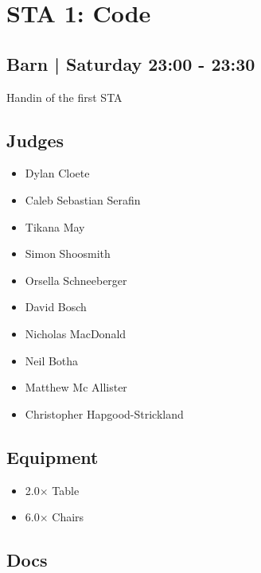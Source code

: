 \documentclass[10pt]{article}
\begin{document}
		\begin{minipage}{\linewidth}
		\setcounter{section}{25}
	\section{STA 1: Code }
	\subsection*{Barn | Saturday 23:00 - 23:30}

	Handin of the first STA

	\begin{multicols}{2}
	\subsection*{\faUsers \: Judges}
	\begin{itemize}
			\item Dylan Cloete
			\item Caleb Sebastian Serafin
			\item Tikana May
			\item Simon Shoosmith
			\item Orsella Schneeberger
			\item David Bosch
			\item Nicholas MacDonald
			\item Neil Botha
			\item Matthew Mc Allister
			\item Christopher Hapgood-Strickland
		\end{itemize}
	\columnbreak
	\subsection*{\faWrench \: Equipment}
	
        \begin{itemize}
                    \item 2.0$\times$ \: Table
                    \item 6.0$\times$ \: Chairs
                \end{itemize}
                \vfill\null
        \subsection*{\faFile \: Docs}
     	\end{multicols}


	\vspace{1cm}
	\end{minipage}
\end{document}
